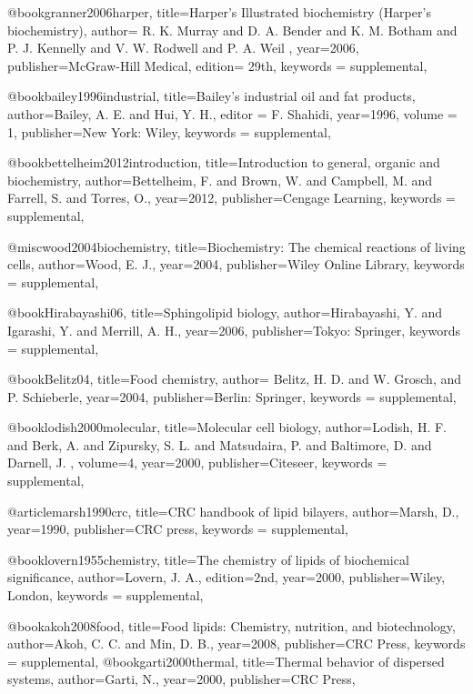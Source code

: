 @book{granner2006harper,
	title={Harper's Illustrated biochemistry ({H}arper's biochemistry)},
	author={ R.  K. Murray and D.  A. Bender and K.  M. Botham and P.  J.  Kennelly and  V.  W. Rodwell  and P. A. Weil },
	year={2006},
	publisher={McGraw-Hill Medical},
	edition= {29th},
	keywords = {supplemental},
}

@book{bailey1996industrial,
	title={Bailey's industrial oil and fat products},
	author={Bailey,  A. E.  and Hui, Y. H.},
	editor = {F.  Shahidi},
	year={1996},
	volume = {1},
	publisher={New York:  Wiley},
	keywords = {supplemental},
}

@book{bettelheim2012introduction,
	title={Introduction to general, organic and biochemistry},
	author={Bettelheim, F.  and Brown, W.  and Campbell,  M. and Farrell, S.  and Torres, O.},
	year={2012},
	publisher={Cengage Learning},
	keywords = {supplemental},
}

@misc{wood2004biochemistry,
	title={Biochemistry: {T}he chemical reactions of living cells},
	author={Wood, E. J.},
	year={2004},
	publisher={Wiley Online Library},
	keywords = {supplemental},
}

@book{Hirabayashi06,
	title={Sphingolipid biology},
	author={Hirabayashi,  Y. and Igarashi,  Y.   and Merrill,  A.  H.},
	year={2006},
	publisher={Tokyo: Springer},
	keywords = {supplemental},
}
 
 @book{Belitz04,
 	title={Food chemistry},
 	author={ Belitz, H. D. and  W. Grosch, and P.  Schieberle},
 	year={2004},
 	publisher={Berlin: Springer},
 	keywords = {supplemental},
 }
 
 @book{lodish2000molecular,
 	title={Molecular cell biology},
 	author={Lodish, H.  F. and Berk, A. and Zipursky, S.  L.  and Matsudaira, P. and Baltimore, D.  and Darnell, J. },
 	volume={4},
 	year={2000},
 	publisher={Citeseer},
	keywords = {supplemental},
 }
 
@article{marsh1990crc,
	title={CRC handbook of lipid bilayers},
	author={Marsh, D.},
	year={1990},
	publisher={CRC press},
	keywords = {supplemental},
}
 
  @book{lovern1955chemistry,
  	title={The chemistry of lipids of biochemical significance},
  	author={Lovern, J.  A.},
  	edition={2nd},
  	year={2000},
  	publisher={Wiley, London},
  	keywords = {supplemental},
  }
 
 @book{akoh2008food,
 	title={Food lipids:  {C}hemistry, nutrition, and biotechnology},
 	author={Akoh, C. C. and Min, D. B.},
 	year={2008},
 	publisher={CRC Press},
 	keywords = {supplemental},
 }
@book{garti2000thermal,
	title={Thermal behavior of dispersed systems},
	author={Garti, N.},
	year={2000},
	publisher={CRC Press},
}

